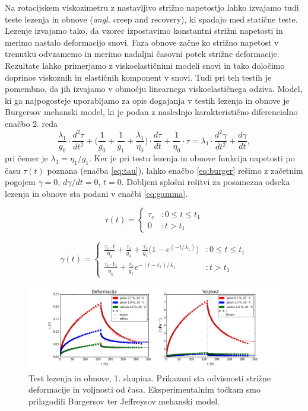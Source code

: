 \documentclass{article}
\begin{document}
Na rotacijskem viskozimetru z nastavljivo strižno napetostjo lahko izvajamo tudi teste lezenja in obnove (\textit{angl.} creep and recovery), ki spadajo med statične teste. Lezenje izvajamo tako, da vzorec izpostavimo konstantni strižni napetosti in merimo nastalo deformacijo snovi. Faza obnove začne ko strižno napetost v trenutku odvzamemo in merimo nadaljni časovni potek strižne deformacije. Rezultate lahko primerjamo z viskoelastičnimi modeli snovi in tako določimo doprinos viskoznih in elastičnih komponent v snovi. Tudi pri teh testih je pomembno, da jih izvajamo v območju linearnega viskoelastičnega odziva.
Model, ki ga najpogosteje uporabljamo za opis dogajanja v testih lezenja in obnove je Burgersov mehanski model, ki je podan z naslednjo karakteristično diferencialno enačbo 2. reda
\begin{equation} \label{eq:burger}
\frac{\lambda_1}{g_0}\cdot\frac{d^2 \tau}{dt^2} + \bigg(\frac{1}{g_0} + \frac{1}{g_1} + \frac{\lambda_1}{\eta_0}\bigg)\cdot\frac{d\tau}{dt} + \frac{1}{\eta_0}\cdot\tau =
\lambda_1 \cdot \frac{d^2\gamma}{dt^2} + \frac{d\gamma}{dt},
\end{equation}
pri čemer je $\lambda_1 = \eta_1 / g_1$. Ker je pri testu lezenja in obnove funkcija napetosti po času $\tau(t)$ poznana (enačba \ref{eq:tau}), lahko enačbo \ref{eq:burger} rešimo z začetnim pogojem $\gamma = 0$, $d\gamma/dt = 0$, $t = 0$. Dobljeni splošni rešitvi za posamezna odseka lezenja in obnove sta podani v enačbi \ref{eq:gamma}.

\begin{equation} \label{eq:tau}
\tau(t) = \begin{cases}
      \tau_c & : 0 \leq t \leq t_1 \\
      0 & : t > t_1 
\end{cases}
\end{equation}

\begin{equation} \label{eq:gamma}
\gamma(t) = \begin{cases}
      \frac{\tau_c \cdot t}{\eta_0} + \frac{\tau_c}{g_0} + \frac{\tau_c}{g_1}\big(1 - e^{(-t/\lambda_1)} \big) & : 0 \leq t \leq t_1 \\
      \frac{\tau_c \cdot t_1}{\eta_0} + \frac{\tau_c}{g_1}e^{-(t-t_1)/\lambda_1} & : t > t_1 
\end{cases}
\end{equation}

\begin{figure}[H]
  \centering
  \includegraphics[width=\linewidth]{S1creep.png}
  \caption{Test lezenja in obnove, 1. skupina. Prikazani sta odvisnosti strižne deformacije in voljnosti od časa. Eksperimentalnim točkam smo prilagodili Burgersov ter Jeffreysov mehanski model.}
  \label{fig:creep1}
\end{figure}
\end{document}
